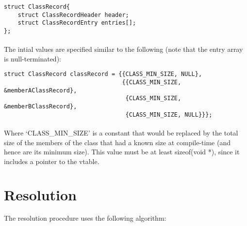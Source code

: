\documentclass{article}
\begin{document}
\begin{verbatim}
struct ClassRecord{
    struct ClassRecordHeader header;
    struct ClassRecordEntry entries[];
};
\end{verbatim}

\paragraph{}
The intial values are specified similar to the following (note that the entry array is null-terminated):

\begin{verbatim}
struct ClassRecord classRecord = {{CLASS_MIN_SIZE, NULL},
                                  {{CLASS_MIN_SIZE, &memberAClassRecord},
                                   {CLASS_MIN_SIZE, &memberBClassRecord},
                                   {CLASS_MIN_SIZE, NULL}}};
\end{verbatim}

\paragraph{}
Where `CLASS\_MIN\_SIZE' is a constant that would be replaced by the total size of the members of the class that had a known size at compile-time (and hence are its minimum size). This value must be at least sizeof(void *), since it includes a pointer to the vtable.

\section{Resolution}

\paragraph{}
The resolution procedure uses the following algorithm:
\end{document}
